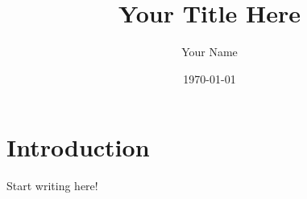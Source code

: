 \documentclass[11pt]{article}
\title{Your Title Here}
\author{Your Name}
\date{\today}
\begin{document}
\maketitle

\section{Introduction}
Start writing here!
\end{document}

